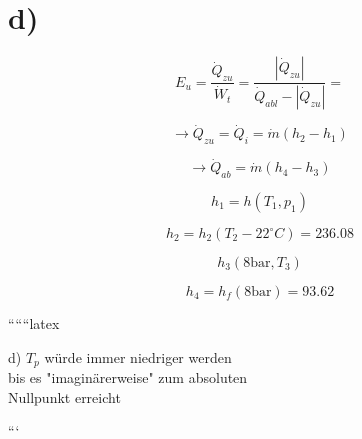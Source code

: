 

\section*{d)}

\[
E_u = \frac{\dot{Q}_{zu}}{\dot{W}_t} = \frac{|\dot{Q}_{zu}|}{\dot{Q}_{abl} - |\dot{Q}_{zu}|} =
\]

\[
\rightarrow \dot{Q}_{zu} = \dot{Q}_i = \dot{m} (h_2 - h_1)
\]

\[
\rightarrow \dot{Q}_{ab} = \dot{m} (h_4 - h_3)
\]

\[
h_1 = h(T_1, p_1)
\]

\[
h_2 = h_2(T_2 - 22^\circ C) = 236.08
\]

\[
h_3 (8 \text{bar}, T_3)
\]

\[
h_4 = h_f (8 \text{bar}) = 93.62
\]

``````latex

d) $T_p$ würde immer niedriger werden \\
bis es "imaginärerweise" zum absoluten \\
Nullpunkt erreicht

```
